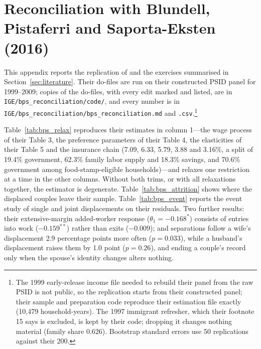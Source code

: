 \section{Reconciliation with Blundell, Pistaferri and Saporta-Eksten (2016)}\label{app:bps}

This appendix reports the replication of \citet{blundell2016consumption} and the exercises summarised in
Section~\ref{sec:literature}. Their do-files are run on their constructed PSID panel for 1999--2009; copies of the
do-files, with every edit marked and listed, are in \texttt{IGE/bps\_reconciliation/code/}, and every number is in
\texttt{IGE/bps\_reconciliation/bps\_reconciliation.md} and \texttt{.csv}.\footnote{The 1999 early-release income file
needed to rebuild their panel from the raw PSID is not public, so the replication starts from their constructed panel;
their sample and preparation code reproduce their estimation file exactly (10,479 household-years). The 1997 immigrant
refresher, which their footnote 15 says is excluded, is kept by their code; dropping it changes nothing material
(family share 0.626). Bootstrap standard errors use 50 replications against their 200.}

Table~\ref{tab:bps_relax} reproduces their estimates in column 1---the wage process of their Table 3, the preference
parameters of their Table 4, the elasticities of their Table 5 and the insurance chain (7.09, 6.33, 5.79, 3.88 and 3.16\%,
a split of 19.4\% government, 62.3\% family labor supply and 18.3\% savings, and 70.6\% government among
food-stamp-eligible households)---and relaxes one restriction at a time in the other columns. Without both trims, or
with all relaxations together, the estimator is degenerate. Table~\ref{tab:bps_attrition} shows where the displaced
couples leave their sample. Table~\ref{tab:bps_event} reports the event study of single and joint displacements on their
residuals. Two further results: their extensive-margin added-worker response ($\theta_1=-0.168^{*}$) consists of entries
into work ($-0.159^{**}$) rather than exits ($-0.009$); and separations follow a wife's displacement 2.9 percentage points
more often ($p=0.033$), while a husband's displacement raises them by 1.0 point ($p=0.26$), and ending a couple's record
only when the spouse's identity changes alters nothing.




